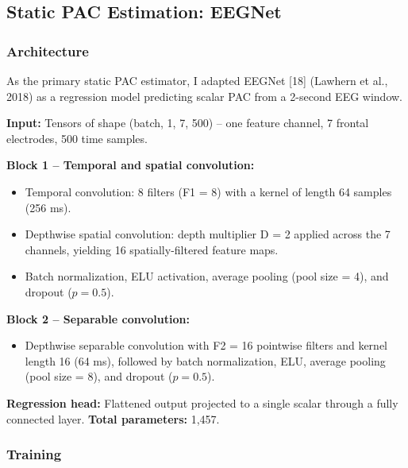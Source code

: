 \documentclass[11pt,letterpaper]{article}
\begin{document}
\subsection{Static PAC Estimation: EEGNet}

\subsubsection{Architecture}

As the primary static PAC estimator, I adapted EEGNet [18] (Lawhern et al., 2018) as a regression model predicting scalar PAC from a 2-second EEG window.

\textbf{Input:} Tensors of shape (batch, 1, 7, 500) -- one feature channel, 7 frontal electrodes, 500 time samples.

\textbf{Block 1 -- Temporal and spatial convolution:}

\begin{itemize}[nosep]
  \item Temporal convolution: 8 filters (F1 = 8) with a kernel of length 64 samples (256 ms).
  \item Depthwise spatial convolution: depth multiplier D = 2 applied across the 7 channels, yielding 16 spatially-filtered feature maps.
  \item Batch normalization, ELU activation, average pooling (pool size = 4), and dropout ($p = 0.5$).
\end{itemize}

\textbf{Block 2 -- Separable convolution:}

\begin{itemize}[nosep]
  \item Depthwise separable convolution with F2 = 16 pointwise filters and kernel length 16 (64 ms), followed by batch normalization, ELU, average pooling (pool size = 8), and dropout ($p = 0.5$).
\end{itemize}

\textbf{Regression head:} Flattened output projected to a single scalar through a fully connected layer. \textbf{Total parameters:} 1,457.

\subsubsection{Training}
\end{document}
